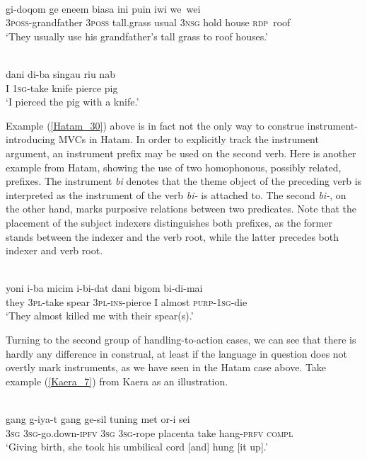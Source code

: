 \ea \label{Klon_87}
\\
\gll gi-doqom ge eneem biasa ini puin iwi we~wei\\
3\textsc{poss}-grandfather 3\textsc{poss} tall.grass usual 3\textsc{nsg} hold house \textsc{rdp}~roof\\
\glft `They usually use his grandfather's tall grass to roof houses.'\\ 
\z

\ea \label{Hatam_30}
\\
\gll dani di-ba singau riu nab \\
I 1\textsc{sg}-take knife pierce pig \\
\glft `I pierced the pig with a knife.'\\ 
\z

Example (\ref{Hatam_30}) above is in fact not the only way to construe instrument-introducing MVCs in Hatam. In order to explicitly track the instrument argument, an instrument prefix may be used on the second verb. Here is another example from Hatam, showing the use of two homophonous, possibly related, prefixes. The instrument \textit{bi} denotes that the theme object of the preceding verb is interpreted as the instrument of the verb \textit{bi-} is attached to. The second \textit{bi-}, on the other hand, marks purposive relations between two predicates. Note that the placement of the subject indexers distinguishes both prefixes, as the former stands between the indexer and the verb root, while the latter precedes both indexer and verb root.

\ea \label{}
\\
\gll yoni i-ba micim i-bi-dat dani bigom bi-di-mai \\
they 3\textsc{pl}-take spear 3\textsc{pl}-\textsc{ins}-pierce I almost \textsc{purp}-1\textsc{sg}-die \\
\glft `They almost killed me with their spear(s).'\\ 
\z

Turning to the second group of handling-to-action cases, we can see that there is hardly any difference in construal, at least if the language in question does not overtly mark instruments, as we have seen in the Hatam case above. Take example (\ref{Kaera_7}) from Kaera as an illustration.

\ea \label{Kaera_7}
\\
\gll gang g-iya-t gang ge-sil tuning met or-i sei \\
3\textsc{sg} 3\textsc{sg}-go.down-\textsc{ipfv} 3\textsc{sg} 3\textsc{sg}-rope placenta take hang-\textsc{prfv} \textsc{compl} \\
\glft `Giving birth, she took his umbilical cord [and] hung [it up].'\\ 
\z


